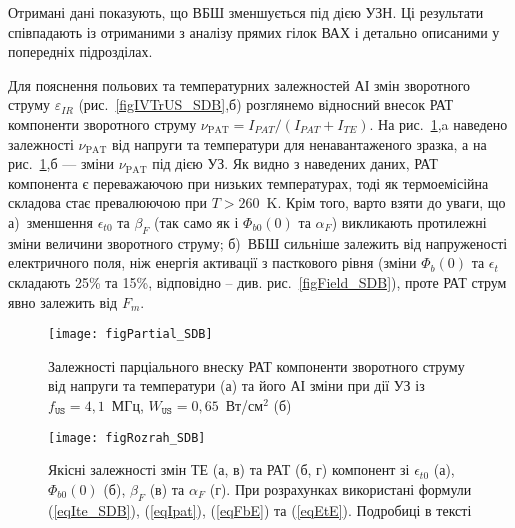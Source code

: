 Отримані дані показують, що ВБШ зменшується під дією УЗН.
Ці результати співпадають із отриманими з аналізу прямих гілок ВАХ і детально описаними у попередніх підрозділах.

Для пояснення польових та температурних залежностей АІ змін зворотного струму $\varepsilon_{IR}$ (рис.~\ref{figIVTrUS_SDB},б)
розглянемо відносний внесок РАТ компоненти зворотного струму
$\nu_\mathrm{PAT}=I_{P\!AT}/(I_{P\!AT}+I_{TE})$.
На рис.~\ref{figPartial_SDB},a наведено залежності $\nu_\mathrm{PAT}$ від напруги та температури для ненавантаженого зразка,
а на рис.~\ref{figPartial_SDB},б --- зміни $\nu_\mathrm{PAT}$ під дією УЗ.
Як видно з наведених даних, РАТ компонента є переважаючою при низьких температурах, тоді як термоемісійна складова стає превалюючою при $T>260$~K.
Крім того, варто взяти до уваги, що
а)~зменшення $\epsilon_{t0}$ та $\beta_F$ (так само як і $\Phi_{b0}(0)$ та $\alpha_F$) викликають протилежні зміни величини зворотного струму;
б)~ВБШ сильніше залежить від напруженості електричного поля, ніж енергія активації з пасткового рівня
(зміни $\Phi_{b}(0)$ та $\epsilon_t$ складають 25\% та 15\%, відповідно -- див. рис.~\ref{figField_SDB}),
проте РАТ струм явно залежить від $F_m$.

\begin{figure}
\center
\texttt{[image: figPartial\_SDB]}
\caption{\label{figPartial_SDB}
Залежності парціального внеску РАТ компоненти зворотного струму від напруги та температури (а)
та його АІ зміни при дії УЗ із $f_\mathtt{US}=4,1$~МГц, $W_\mathtt{US}=0,65$~Вт/см$^2$ (б)
}%
\end{figure}





\begin{figure}
\center
\texttt{[image: figRozrah\_SDB]}
\caption{\label{figRozrah_SDB}
Якісні залежності змін ТЕ (а, в) та РАТ (б, г) компонент зі $\epsilon_{t0}$ (а),
$\Phi_{b0}(0)$ (б),
$\beta_F$ (в)
та $\alpha_F$ (г).
При розрахунках використані формули (\ref{eqIte_SDB}), (\ref{eqIpat}), (\ref{eqFbE}) та (\ref{eqEtE}).
Подробиці в тексті
}%
\end{figure}

